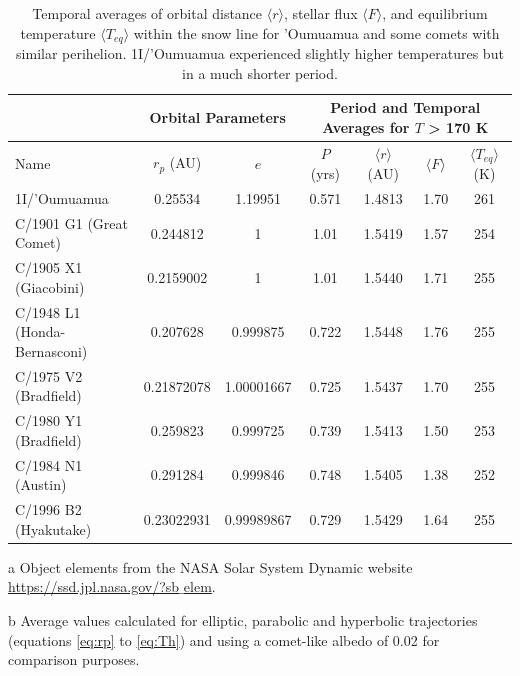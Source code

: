 \documentclass[a4paper,fleqn,usenatbib]{mnras}
\begin{document}

\begin{table}
\begin{threeparttable}
\centering
\caption{Temporal averages of orbital distance $\langle r \rangle$, stellar flux $\langle F \rangle$, and equilibrium temperature $\langle T_{eq} \rangle$ within the snow line for 'Oumuamua and some comets with similar perihelion. 1I/'Oumuamua experienced slightly higher temperatures but in a much shorter period.}
\begin{tabular}{ l c c | c c c c }
 \hline
 \hline
 & \multicolumn{2}{c}{Orbital Parameters\tnote{a}} & \multicolumn{4}{c}{Period and Temporal Averages for $T$ > 170 K\tnote{b}} \\
 \hline
 Name & $r_p$ (AU) & $e$ & $P$ (yrs) &
 	$\langle r \rangle$ (AU) & $\langle F \rangle$ & $\langle T_{eq} \rangle$ (K) \\ 
 \hline
 1I/'Oumuamua & 0.25534 & 1.19951 & 0.571 & 1.4813 & 1.70 & 261 \\
 C/1901 G1 (Great Comet) & 0.244812 & 1 & 1.01 & 1.5419 & 1.57 & 254 \\
 C/1905 X1 (Giacobini) & 0.2159002 & 1 & 1.01 & 1.5440 & 1.71 & 255 \\
C/1948 L1 (Honda-Bernasconi) & 0.207628 & 0.999875 & 0.722 & 1.5448 & 1.76 & 255 \\
 C/1975 V2 (Bradfield) & 0.21872078 & 1.00001667 & 0.725 & 1.5437 & 1.70 & 255 \\
 C/1980 Y1 (Bradfield) & 0.259823 & 0.999725 & 0.739 & 1.5413 & 1.50 & 253 \\
 C/1984 N1 (Austin) & 0.291284 & 0.999846 & 0.748 & 1.5405 & 1.38 & 252 \\
 C/1996 B2 (Hyakutake) & 0.23022931	& 0.99989867 & 0.729 & 1.5429 & 1.64 & 255 \\
 \hline
 \hline
\end{tabular}
\label{tab:escape}
	\begin{tablenotes}
	\small
\item[a]{Object elements from the NASA Solar System Dynamic website \href{https://ssd.jpl.nasa.gov/?sb$\_$elem}{https://ssd.jpl.nasa.gov/?sb$\_$elem}.}
\item[b]{Average values calculated for elliptic, parabolic and hyperbolic trajectories (equations \ref{eq:rp} to \ref{eq:Th}) and using a comet-like albedo of 0.02 for comparison purposes.}
	\end{tablenotes}
\end{threeparttable}
\end{table}
\end{document}
